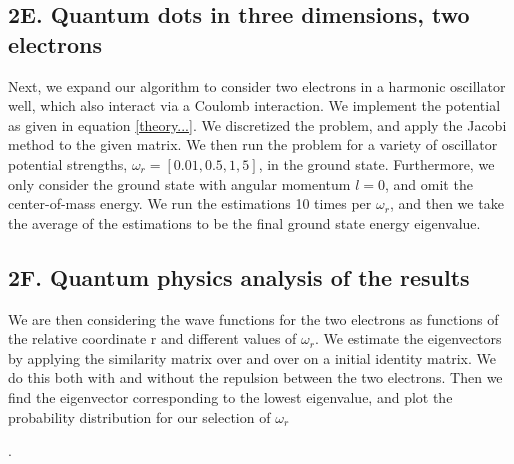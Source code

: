 \documentclass[%
reprint,
amsmath,amssymb,
aps,
]{revtex4-1}
\begin{document}
\subsection{2E. Quantum dots in three dimensions, two electrons}
Next, we expand our algorithm to consider two electrons in a harmonic oscillator well, which also interact via a Coulomb interaction. We implement the potential as given in equation \ref{theory...}. We discretized the problem, and apply the Jacobi method to the given matrix. We then run the problem for a variety of oscillator potential strengths, $\omega_r = [0.01,0.5,1,5]$, in the ground state. Furthermore, we only consider the ground state with angular momentum $l = 0$, and omit the center-of-mass energy. We run the estimations 10 times per $\omega_r$, and then we take the average of the estimations to be the final ground state energy eigenvalue.

\subsection{2F. Quantum physics analysis of the results}
We are then considering the wave functions for the two electrons as functions of the relative coordinate r and different values of $\omega_r$. We estimate the eigenvectors by applying the similarity matrix over and over on a initial identity matrix. We do this both with and without the repulsion between the two electrons. Then we find the eigenvector corresponding to the lowest eigenvalue, and plot the probability distribution for our selection of $\omega_r$ 

\newpage.
\newpage 
\end{document}
